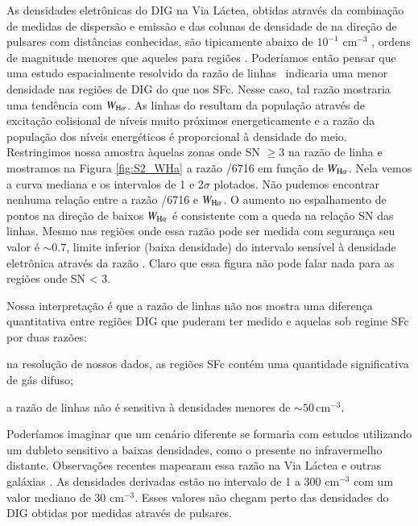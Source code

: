 As densidades eletrônicas do DIG na Via Láctea, obtidas através da combinação de medidas de dispersão e emissão e das colunas de densidade de \hi na direção de pulsares com distâncias conhecidas, são tipicamente abaixo de $10^{-1}$ cm$^{-3}$ \citep{Berk.and.Fletcher.2008}, ordens de magnitude menores que aqueles para regiões \hii. Poderíamos então pensar que uma estudo espacialmente resolvido da razão de linhas \Sii\ indicaria uma menor densidade nas regiões de DIG do que nos SFc. Nesse caso, tal razão mostraria uma tendência com $W_{\Ha}$. As linhas do \sii resultam da população através de excitação colisional de níveis muito próximos energeticamente e a razão da população dos níveis energéticos é proporcional à densidade do meio. Restringimos nossa amostra àquelas zonas onde SN $\ge 3$ na razão de linha \sii e mostramos na Figura \ref{fig:S2_WHa} a razão /6716 em função de $W_{\Ha}$. Nela vemos a curva mediana e os intervalos de 1 e 2$\sigma$ plotados. Não pudemos encontrar nenhuma relação entre a razão /6716 e $W_{\Ha}$. O aumento no espalhamento de pontos na direção de baixos $W_{\Ha}$ é consistente com a queda na relação SN das linhas. Mesmo nas regiões onde essa razão pode ser medida com segurança seu valor é $\sim 0.7$, limite inferior (baixa densidade) do intervalo sensível à densidade eletrônica através da razão \sii. Claro que essa figura não pode falar nada para as regiões onde SN < 3.

Nossa interpretação é que a razão de linhas \sii não nos mostra uma diferença quantitativa entre regiões DIG que puderam ter \sii medido e aquelas sob regime SFc por duas razões:
\begin{enumerate*}[label=(\roman*)]
    \item na resolução de nossos dados, as regiões SFc contém uma quantidade significativa de gás difuso;
    \item a razão de linhas \sii não é sensitiva à densidades menores de $\sim 50$\,cm$^{-3}$.
\end{enumerate*}

Poderíamos imaginar que um cenário diferente se formaria com estudos utilizando um dubleto sensitivo a baixas densidades, como o \Nii presente no infravermelho distante. Observações recentes mapearam essa razão na Via Láctea e outras galáxias \citep{Goldsmith.etal.2015, HerreraCamus.etal.2016}. As densidades derivadas estão no intervalo de 1 a 300 cm$^{-3}$ com um valor mediano de 30 cm$^{-3}$. Esses valores não chegam perto das densidades do DIG obtidas por medidas através de pulsares.

